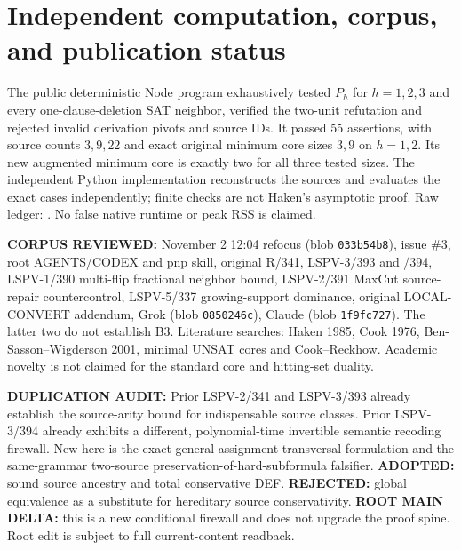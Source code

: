 \documentclass[11pt]{article}
\begin{document}
\section*{Independent computation, corpus, and publication status}
The public deterministic Node program  exhaustively tested $P_h$ for $h=1,2,3$ and every one-clause-deletion SAT neighbor, verified the two-unit refutation and rejected invalid derivation pivots and source IDs. It passed 55 assertions, with source counts $3,9,22$ and exact original minimum core sizes $3,9$ on $h=1,2$. Its new augmented minimum core is exactly two for all three tested sizes. The independent Python implementation  reconstructs the sources and evaluates the exact cases independently; finite checks are not Haken's asymptotic proof. Raw ledger: . No false native runtime or peak RSS is claimed.

\noindent\textbf{CORPUS REVIEWED:} November 2 12:04 refocus (blob \texttt{033b54b8}), issue \#3, root AGENTS/CODEX and pnp skill, original R/341, LSPV-3/393 and /394, LSPV-1/390 multi-flip fractional neighbor bound, LSPV-2/391 MaxCut source-repair countercontrol, LSPV-5/337 growing-support dominance, original LOCAL-CONVERT addendum, Grok  (blob \texttt{0850246c}), Claude  (blob \texttt{1f9fc727}). The latter two do not establish B3. Literature searches: Haken 1985, Cook 1976, Ben-Sasson--Wigderson 2001, minimal UNSAT cores and Cook--Reckhow. Academic novelty is not claimed for the standard core and hitting-set duality.

\noindent\textbf{DUPLICATION AUDIT:} Prior LSPV-2/341 and LSPV-3/393 already establish the source-arity bound for indispensable source classes. Prior LSPV-3/394 already exhibits a different, polynomial-time invertible semantic recoding firewall. New here is the exact general assignment-transversal formulation and the same-grammar two-source preservation-of-hard-subformula falsifier. \textbf{ADOPTED:} sound source ancestry and total conservative DEF. \textbf{REJECTED:} global equivalence as a substitute for hereditary source conservativity. \textbf{ROOT MAIN DELTA:} this is a new conditional firewall and does not upgrade the proof spine. Root edit is subject to full current-content readback.
\end{document}
